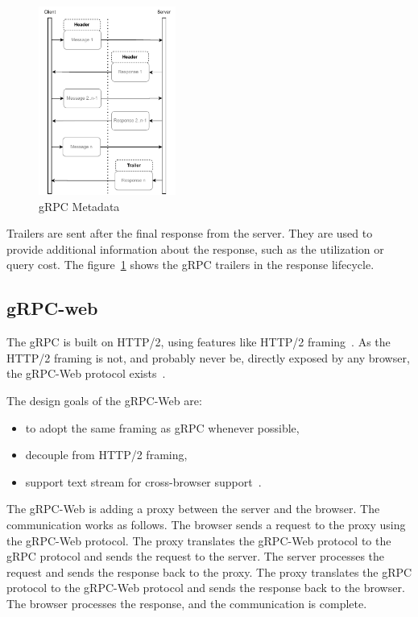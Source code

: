 \begin{figure}[hbt!]
    \centering
    \captionsetup{justification=centering}
    \includegraphics[width=0.4\textwidth]{images/grpc-metadata}
    \caption{gRPC Metadata}
    \label{fig:grpc-metadata}
\end{figure}

Trailers are sent after the final response from the server.
They are used to provide additional information about the response, such as the utilization or query cost.
The figure~\ref{fig:grpc-metadata} shows the gRPC trailers in the response lifecycle.

\cite{grpc-metadata}

\subsection{gRPC-web}
The gRPC is built on HTTP/2, using features like HTTP/2 framing~\cite{grpc-protocol-http2}.
As the HTTP/2 framing is not, and probably never be, directly exposed by any browser, the gRPC-Web protocol exists~\cite{grpc-protocol-web}.

The design goals of the gRPC-Web are:
\begin{itemize}
    \item to adopt the same framing as gRPC whenever possible,
    \item decouple from HTTP/2 framing,
    \item support text stream for cross-browser support~\cite{grpc-protocol-web}.
\end{itemize}

The gRPC-Web is adding a proxy between the server and the browser.
The communication works as follows.
The browser sends a request to the proxy using the gRPC-Web protocol.
The proxy translates the gRPC-Web protocol to the gRPC protocol and sends the request to the server.
The server processes the request and sends the response back to the proxy.
The proxy translates the gRPC protocol to the gRPC-Web protocol and sends the response back to the browser.
The browser processes the response, and the communication is complete.
\cite{grpc-protocol-web}

